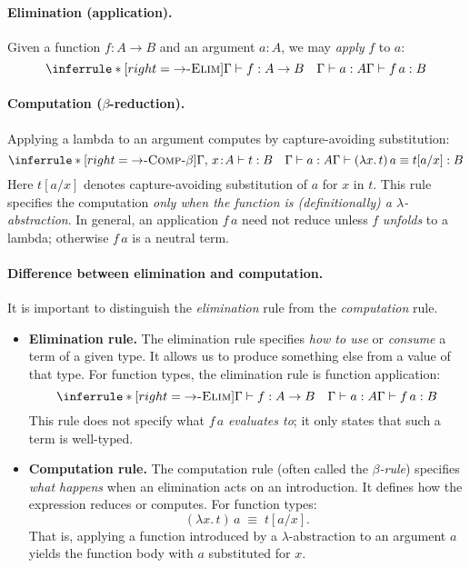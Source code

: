 \documentclass{article}
\newcommand{\judg}[3]{#1 \vdash #2 : #3}   %
\newcommand{\jdeq}{\equiv}                 %
\newcommand{\teq}[4]{#1 \vdash #2 \jdeq #3 : #4} %
\newcommand{\rulename}[1]{\textsc{#1}}
\begin{document}
\paragraph{Elimination (application).}
Given a function \(f:A\to B\) and an argument \(a:A\), we may \emph{apply} \(f\) to \(a\):
\[
\inferrule*[right=\rulename{\(\to\)-Elim}]{
  \judg{\Gamma}{f}{A \to B}
  \quad
  \judg{\Gamma}{a}{A}
}{
  \judg{\Gamma}{f\,a}{B}
}
\]

\paragraph{Computation (\(\beta\)-reduction).}
Applying a lambda to an argument computes by capture-avoiding substitution:
\[
\inferrule*[right=\rulename{\(\to\)-Comp-\(\beta\)}]{
  \judg{\Gamma,\,x\!:\!A}{t}{B}
  \quad
  \judg{\Gamma}{a}{A}
}{
  \teq{\Gamma}{(\lambda x.\,t)\,a}{t[a/x]}{B}
}
\]
Here \(t[a/x]\) denotes capture-avoiding substitution of \(a\) for \(x\) in \(t\). This rule specifies the computation \emph{only when the function is (definitionally) a \(\lambda\)-abstraction}. In general, an application \(f\,a\) need not reduce unless \(f\) \emph{unfolds} to a lambda; otherwise \(f\,a\) is a neutral term.

\paragraph{Difference between elimination and computation.}
It is important to distinguish the \emph{elimination} rule from the \emph{computation} rule.

\begin{itemize}
  \item \textbf{Elimination rule.}  
  The elimination rule specifies \emph{how to use} or \emph{consume} a term of a given type.
  It allows us to produce something else from a value of that type.
  For function types, the elimination rule is function application:
  \[
  \inferrule*[right=\rulename{\(\to\)-Elim}]{
    \judg{\Gamma}{f}{A \to B}
    \quad
    \judg{\Gamma}{a}{A}
  }{
    \judg{\Gamma}{f\,a}{B}
  }
  \]
  This rule does not specify what $f\,a$ \emph{evaluates to}; it only states that
  such a term is well-typed.

  \item \textbf{Computation rule.}  
  The computation rule (often called the \emph{$\beta$-rule}) specifies
  \emph{what happens} when an elimination acts on an introduction.
  It defines how the expression reduces or computes.
  For function types:
  \[
  (\lambda x.\,t)\,a \;\jdeq\; t[a/x].
  \]
  That is, applying a function introduced by a $\lambda$-abstraction
  to an argument $a$ yields the function body with $a$ substituted for $x$.

\end{itemize}
\end{document}
